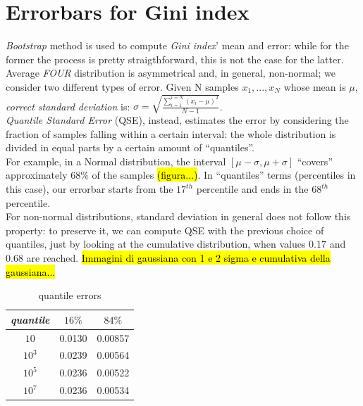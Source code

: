 \appendix
\section{Errorbars for Gini index}

\textit{Bootstrap} method\cite{bootstrap} is used to compute
\textit{Gini index}' mean and error: while for the former the process
is pretty straigthforward, this is not the case for the latter.
Average \textit{FOUR} distribution is asymmetrical and, in general,
non-normal; we consider two different types of error.
Given N samples ${x_1,...,x_N}$ whose mean is $\mu$,
\textit{correct standard deviation} is:
$\sigma=\sqrt{\frac{\sum_{i=1}^{i=N}(x_i - \mu)^2}{N-1}}$.\\
\textit{Quantile Standard Error} (QSE)\cite{quantile}, instead,
estimates the error by considering the fraction of samples
falling within a certain interval: the whole distribution is
divided in equal parts by a certain amount of ``quantiles''.\\
For example, in a Normal distribution, the interval
$[\mu -\sigma, \mu +\sigma]$ ``covers'' approximately $68\%$
of the samples \hl{(figura...)}.
In ``quantiles'' terms (percentiles in this case), our errorbar
starts from the $17^{th}$ percentile and ends in the $68^{th}$
percentile.\\
For non-normal distributions, standard deviation in general does
not follow this property: to preserve it, we can compute QSE with
the previous choice of quantiles, just by looking at the cumulative
distribution, when values 0.17 and 0.68 are reached.
\hl{Immagini di gaussiana con 1 e 2 sigma e cumulativa della gaussiana...}
\begin{table}[htpb]
  \centering
  \begin{tabular}{ccc}
    \toprule
    \textit{quantile} & $16\%$ & $84\%$ \\
    \midrule
    $10$   & 0.0130 & 0.00857 \\
    $10^3$ & 0.0239 & 0.00564 \\
    $10^5$ & 0.0236 & 0.00522 \\
    $10^7$ & 0.0236 & 0.00534 \\
    \bottomrule
  \end{tabular}
  \caption{quantile errors}
  \label{tab:quantile}
\end{table}
